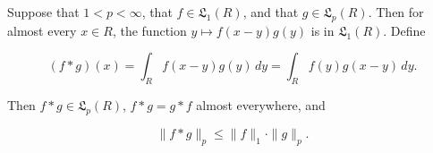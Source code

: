 Suppose that $1 < p < \infty$, that $f \in \mathfrak{L}_1(R)$, and that $g \in \mathfrak{L}_p(R)$. Then for almost every $x \in R$, the function $y \mapsto f(x - y)g(y)$ is in $\mathfrak{L}_1(R)$. Define

$$(f * g)(x) = \int_R f(x - y)g(y) \, dy = \int_R f(y)g(x - y) \, dy.$$

Then $f * g \in \mathfrak{L}_p(R)$, $f * g = g * f$ almost everywhere, and

$$\|f * g\|_p \leq \|f\|_1 \cdot \|g\|_p.$$
